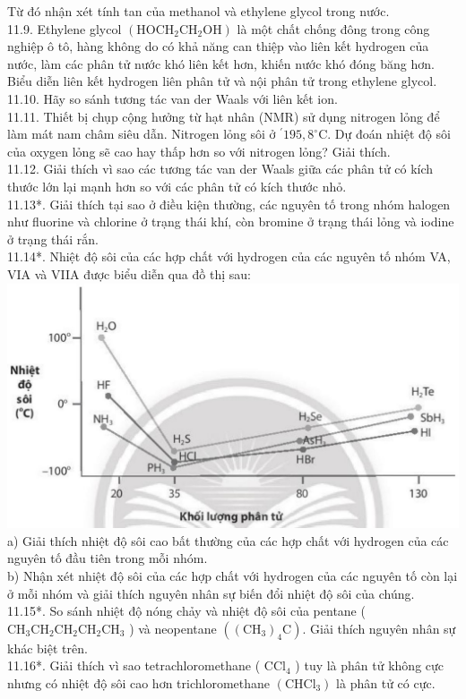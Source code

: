 \documentclass[10pt]{article}
\begin{document}
Từ đó nhận xét tính tan của methanol và ethylene glycol trong nước.\\
11.9. Ethylene glycol $\left(\mathrm{HOCH}_{2} \mathrm{CH}_{2} \mathrm{OH}\right)$ là một chất chống đông trong công nghiệp ô tô, hàng không do có khả năng can thiệp vào liên kết hydrogen của nước, làm các phân tử nước khó liên kết hơn, khiến nước khó đóng băng hơn. Biểu diễn liên kết hydrogen liên phân tử và nội phân tử trong ethylene glycol.\\
11.10. Hãy so sánh tương tác van der Waals với liên kết ion.\\
11.11. Thiết bị chụp cộng hưởng từ hạt nhân (NMR) sử dụng nitrogen lỏng để làm mát nam châm siêu dẫn. Nitrogen lỏng sôi ở $^{\prime} 195,8^{\circ} \mathrm{C}$. Dự đoán nhiệt độ sôi của oxygen lỏng sẽ cao hay thấp hơn so với nitrogen lỏng? Giải thích.\\
11.12. Giải thích vì sao các tương tác van der Waals giữa các phân tử có kích thước lớn lại mạnh hơn so với các phân tử có kích thước nhỏ.\\
11.13*. Giải thích tại sao ở điều kiện thường, các nguyên tố trong nhóm halogen như fluorine và chlorine ở trạng thái khí, còn bromine ở trạng thái lỏng và iodine ở trạng thái rắn.\\
11.14*. Nhiệt độ sôi của các hợp chất với hydrogen của các nguyên tố nhóm VA, VIA và VIIA được biểu diễn qua đồ thị sau:\\
\includegraphics[max width=\textwidth, center]{2025_10_23_883c4b146e2332109fcdg-36}\\
a) Giải thích nhiệt độ sôi cao bất thường của các hợp chất với hydrogen của các nguyên tố đầu tiên trong mỗi nhóm.\\
b) Nhận xét nhiệt độ sôi của các hợp chất với hydrogen của các nguyên tố còn lại ở mỗi nhóm và giải thích nguyên nhân sự biến đổi nhiệt độ sôi của chúng.\\
11.15*. So sánh nhiệt độ nóng chảy và nhiệt độ sôi của pentane ( $\mathrm{CH}_{3} \mathrm{CH}_{2} \mathrm{CH}_{2} \mathrm{CH}_{2} \mathrm{CH}_{3}$ ) và neopentane $\left(\left(\mathrm{CH}_{3}\right)_{4} \mathrm{C}\right)$. Giải thích nguyên nhân sự khác biệt trên.\\
11.16*. Giải thích vì sao tetrachloromethane ( $\mathrm{CCl}_{4}$ ) tuy là phân tử không cực nhưng có nhiệt độ sôi cao hơn trichloromethane $\left(\mathrm{CHCl}_{3}\right)$ là phân tử có cực.
\end{document}
